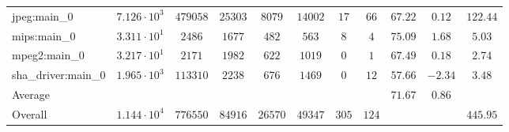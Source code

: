 \begin{tabular}{|l|c|c|c|c|c|c|c|c|c|c|}
jpeg:main\_0            & $ 7.126 \cdot 10^{3} $ & $ 479058 $ & $ 25303 $ & $ 8079  $ & $ 14002 $ & $ 17  $ & $ 66  $ & $ 67.22       $ & $ 0.12    $ & $ 122.44  $ \\
mips:main\_0            & $ 3.311 \cdot 10^{1} $ & $ 2486   $ & $ 1677  $ & $ 482   $ & $ 563   $ & $ 8   $ & $ 4   $ & $ 75.09       $ & $ 1.68    $ & $ 5.03    $ \\
mpeg2:main\_0           & $ 3.217 \cdot 10^{1} $ & $ 2171   $ & $ 1982  $ & $ 622   $ & $ 1019  $ & $ 0   $ & $ 1   $ & $ 67.49       $ & $ 0.18    $ & $ 2.74    $ \\
sha\_driver:main\_0     & $ 1.965 \cdot 10^{3} $ & $ 113310 $ & $ 2238  $ & $ 676   $ & $ 1469  $ & $ 0   $ & $ 12  $ & $ 57.66       $ & $ -2.34   $ & $ 3.48    $ \\
\hline
Average                 & $                    $ & $        $ & $       $ & $       $ & $       $ & $     $ & $     $ & $ 71.67       $ & $ 0.86    $ & $         $ \\
\hline
Overall                 & $ 1.144 \cdot 10^{4} $ & $ 776550 $ & $ 84916 $ & $ 26570 $ & $ 49347 $ & $ 305 $ & $ 124 $ & $             $ & $         $ & $ 445.95  $ \\
\hline
\end{tabular}
